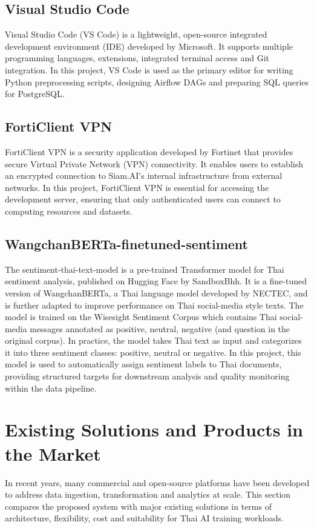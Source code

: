 \documentclass[12pt,oneside,openright,a4paper]{cpe-english-project}
\begin{document}
\subsection{Visual Studio Code}
Visual Studio Code (VS Code) is a lightweight, open-source integrated development environment (IDE) developed by Microsoft. It supports multiple programming languages, extensions, integrated terminal access and Git integration. In this project, VS Code is used as the primary editor for writing Python preprocessing scripts, designing Airflow DAGs and preparing SQL queries for PostgreSQL.

\subsection{FortiClient VPN}
FortiClient VPN is a security application developed by Fortinet that provides secure Virtual Private Network (VPN) connectivity. It enables users to establish an encrypted connection to Siam.AI's internal infrastructure from external networks. In this project, FortiClient VPN is essential for accessing the development server, ensuring that only authenticated users can connect to computing resources and datasets.

\subsection{WangchanBERTa-finetuned-sentiment}
The sentiment-thai-text-model is a pre-trained Transformer model for Thai sentiment analysis, published on Hugging Face by SandboxBhh. It is a fine-tuned version of WangchanBERTa, a Thai language model developed by NECTEC, and is further adapted to improve performance on Thai social-media style texts. The model is trained on the Wisesight Sentiment Corpus which contains Thai social-media messages annotated as positive, neutral, negative (and question in the original corpus). In practice, the model takes Thai text as input and categorizes it into three sentiment classes: positive, neutral or negative. In this project, this model is used to automatically assign sentiment labels to Thai documents, providing structured targets for downstream analysis and quality monitoring within the data pipeline.

\section{Existing Solutions and Products in the Market}

In recent years, many commercial and open-source platforms have been developed to address data ingestion, transformation and analytics at scale. This section compares the proposed system with major existing solutions in terms of architecture, flexibility, cost and suitability for Thai AI training workloads.
\end{document}
